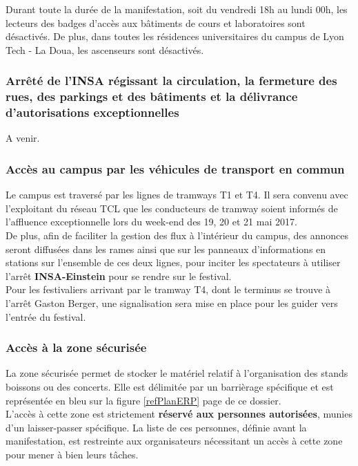 \documentclass[hidelinks, paper=a4, fontsize=13pt]{report}
\begin{document}
Durant toute la durée de la manifestation, soit du vendredi 18h au lundi 00h, les lecteurs des badges d’accès aux bâtiments de cours et laboratoires sont désactivés. De plus, dans toutes les résidences universitaires du campus de Lyon Tech - La Doua, les ascenseurs sont désactivés.\\


\subsubsection{Arrêté de l'INSA régissant la circulation, la fermeture des rues, des parkings et des bâtiments et la délivrance d'autorisations exceptionnelles}

A venir.

\subsubsection{Accès au campus par les véhicules de transport en commun}

Le campus est traversé par les lignes de tramways T1 et T4. Il sera convenu avec l’exploitant du réseau TCL que les conducteurs de tramway soient informés de l’affluence exceptionnelle lors du week-end des 19, 20 et 21 mai 2017.\\

De plus, afin de faciliter la gestion des flux à l’intérieur du campus, des annonces seront diffusées dans les rames ainsi que sur les panneaux d’informations en stations sur l’ensemble de ces deux lignes, pour inciter les spectateurs à utiliser l’arrêt \textbf{INSA-Einstein} pour se rendre sur le festival.\\

Pour les festivaliers arrivant par le tramway T4, dont le terminus se trouve à l’arrêt Gaston Berger, une signalisation sera mise en place pour les guider vers l’entrée du festival.
\subsubsection{Accès à la zone sécurisée}

La zone sécurisée permet de stocker le matériel relatif à l’organisation des stands boissons ou des concerts. Elle est délimitée par un barrièrage spécifique et est représentée en bleu sur la figure \ref{refPlanERP} page \pageref{refPlanERP} de ce dossier.\\

L’accès à cette zone est strictement \textbf{réservé aux personnes autorisées}, munies d’un laisser-passer spécifique. La liste de ces personnes, définie avant la manifestation, est restreinte aux organisateurs nécessitant un accès à cette zone pour mener à bien leurs tâches. \\
\end{document}
